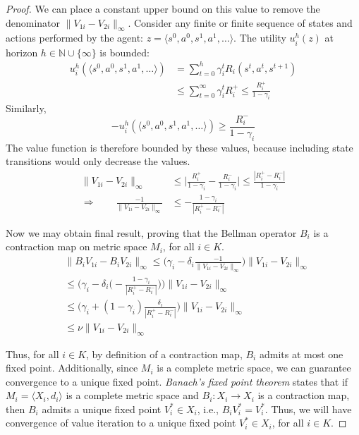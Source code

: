 \begin{proof}
We can place a constant upper bound on this value to remove the denominator $\| V_{1i} - V_{2i} \|_\infty$. Consider any finite or finite sequence of states and actions performed by the agent: $z = \langle s^0, a^0, s^1, a^1, \ldots \rangle$. The utility $u_i^h(z)$ at horizon $h \in \mathbb{N} \cup \{ \infty \}$ is bounded:
\begin{align*}
    u_i^h(\langle s^0, a^0, s^1, a^1, \ldots \rangle) &= \sum_{t=0}^h \gamma_i^t R_i(s^t, a^t, s^{t+1}) \\
        &\leq \sum_{t=0}^\infty \gamma_i^t R_i^+ \leq \frac{R_i^+}{1 - \gamma_i}
\end{align*}
Similarly,
\begin{equation*}
    -u_i^h(\langle s^0, a^0, s^1, a^1, \ldots \rangle) \geq \frac{R_i^-}{1 - \gamma_i}
\end{equation*}
The value function is therefore bounded by these values, because including state transitions would only decrease the values.
\begin{align*}
    \| V_{1i} - V_{2i} \|_\infty &\leq \Big| \frac{R_i^+}{1 - \gamma_i} - \frac{R_i^-}{1 - \gamma_i} \Big| \leq \frac{|R_i^+ - R_i^-|}{1 - \gamma_i} \\
    \Rightarrow \quad \quad \frac{-1}{\| V_{1i} - V_{2i} \|_\infty} &\leq -\frac{1 - \gamma_i}{|R_i^+ - R_i^-|}
\end{align*}

Now we may obtain final result, proving that the Bellman operator $B_i$ is a contraction map on metric space $M_i$, for all $i \in K$.
\begin{align*}
    &\| B_i V_{1i} - B_i V_{2i} \|_\infty \leq \Big( \gamma_i - \delta_i \frac{-1}{\|V_{1i} - V_{2i}\|_\infty}  \Big) \| V_{1i} - V_{2i} \|_\infty \\
    &\leq \Big( \gamma_i - \delta_i \Big( -\frac{1 - \gamma_i}{|R_i^+ - R_i^-|} \Big) \Big) \| V_{1i} - V_{2i} \|_\infty \\
    &\leq \Big( \gamma_i + (1 - \gamma_i) \frac{\delta_i}{|R_i^+ - R_i^-|} \Big) \| V_{1i} - V_{2i} \|_\infty \\
    &\leq \nu \| V_{1i} - V_{2i} \|_\infty
\end{align*}

Thus, for all $i \in K$, by definition of a contraction map, $B_i$ admits at most one fixed point. Additionally, since $M_i$ is a complete metric space, we can guarantee convergence to a unique fixed point. \emph{Banach's fixed point theorem} states that if $M_i = \langle X_i, d_i \rangle$ is a complete metric space and $B_i: X_i \rightarrow X_i$ is a contraction map, then $B_i$ admits a unique fixed point $V_i^* \in X_i$, i.e., $B_i V_i^* = V_i^*$. Thus, we will have convergence of value iteration to a unique fixed point $V_i^* \in X_i$, for all $i \in K$.
\end{proof}

